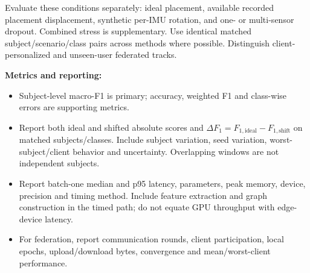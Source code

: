 \documentclass[10pt,a4paper]{article}
\begin{document}
Evaluate these conditions separately: ideal placement, available recorded placement displacement, synthetic per-IMU rotation, and one- or multi-sensor dropout. Combined stress is supplementary. Use identical matched subject/scenario/class pairs across methods where possible. Distinguish client-personalized and unseen-user federated tracks.

\textbf{Metrics and reporting:}
\begin{itemize}
\item Subject-level macro-F1 is primary; accuracy, weighted F1 and class-wise errors are supporting metrics.
\item Report both ideal and shifted absolute scores and $\Delta F_1=F_{1,\mathrm{ideal}}-F_{1,\mathrm{shift}}$ on matched subjects/classes. Include subject variation, seed variation, worst-subject/client behavior and uncertainty. Overlapping windows are not independent subjects.
\item Report batch-one median and p95 latency, parameters, peak memory, device, precision and timing method. Include feature extraction and graph construction in the timed path; do not equate GPU throughput with edge-device latency.
\item For federation, report communication rounds, client participation, local epochs, upload/download bytes, convergence and mean/worst-client performance.
\end{itemize}
\end{document}
